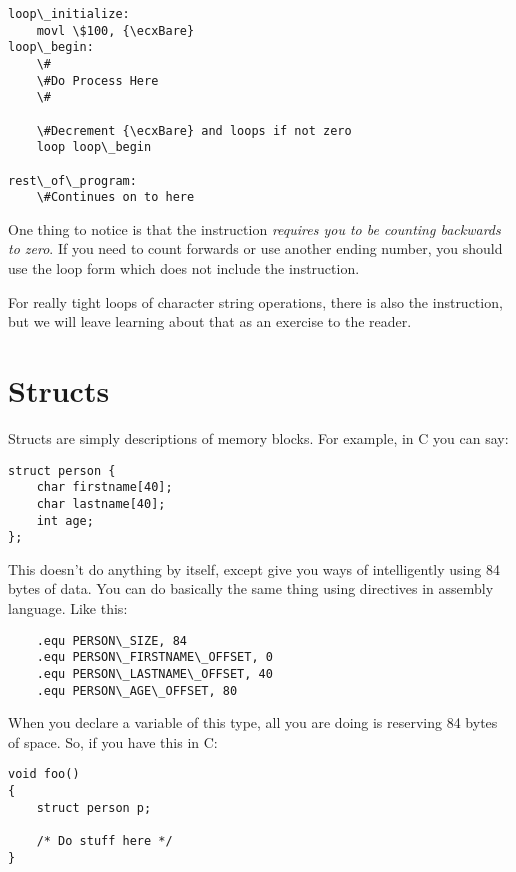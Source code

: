 \begin{simpletyping}
\begin{lstlisting}
loop\_initialize:
	movl \$100, {\ecxBare}
loop\_begin:
	\#
	\#Do Process Here
	\#

	\#Decrement {\ecxBare} and loops if not zero
	loop loop\_begin 

rest\_of\_program:
	\#Continues on to here
\end{lstlisting}
\end{simpletyping}

One thing to notice is that the  instruction 
\emph{requires you to be counting backwards to zero}.  If
you need to count forwards or use another ending number, you should use
the loop form which does not include the  instruction.

For really tight loops of character string operations, there is also the 
 instruction, but we will leave learning about
that as an exercise to the reader.

\section{Structs}

Structs are simply descriptions of memory blocks.  For example,
in C you can say:

\begin{simpletyping}
\begin{lstlisting}
struct person {
	char firstname[40];
	char lastname[40];
	int age;
};
\end{lstlisting}
\end{simpletyping}

This doesn't do anything by itself, except give you ways of intelligently 
using 84 bytes of data.  You can do basically the same thing using
 directives in assembly language.  Like this:

\begin{simpletyping}
\begin{lstlisting}
	.equ PERSON\_SIZE, 84
	.equ PERSON\_FIRSTNAME\_OFFSET, 0
	.equ PERSON\_LASTNAME\_OFFSET, 40
	.equ PERSON\_AGE\_OFFSET, 80
\end{lstlisting}
\end{simpletyping}

When you declare a variable of this type, all you are doing is reserving 84
bytes of space.  So, if you have this in C:

\begin{simpletyping}
\begin{lstlisting}
void foo()
{
	struct person p;

	/* Do stuff here */
}
\end{lstlisting}
\end{simpletyping}

